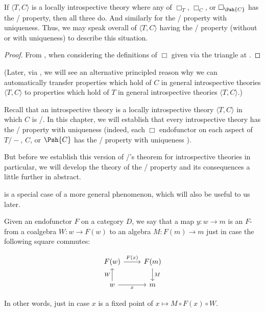 \begin{corollary}\label{LoebTransferIntrosp}
If $\langle T, C \rangle$ is a locally introspective theory where any of $\Box_T$, $\Box_C$, or $\Box_{\Psh{C}}$ has the \Loeb/ property, then all three do. And similarly for the \Loeb/ property with uniqueness. Thus, we may speak overall of $\langle T, C \rangle$ having the \Loeb/ property (without or with uniqueness) to describe this situation.
\end{corollary}
\begin{proof}
From , when considering the definitions of $\Box$ given via the triangle at .
\end{proof}

(Later, via , we will see an alternative principled reason why we can automatically transfer properties which hold of $C$ in general introspective theories $\langle T, C \rangle$ to properties which hold of $T$ in general introspective theories $\langle T, C \rangle$.)

Recall that an introspective theory is a locally introspective theory $\langle T, C \rangle$ in which $C$ is \repsmall/. In this chapter, we will establish that every introspective theory has the \Loeb/ property with uniqueness (indeed, each $\Box$ endofunctor on each aspect of $T/-$, $C$, or $\Psh{C}$ has the \Loeb/ property with uniqueness ).

But before we establish this version of \Loeb/'s theorem for introspective theories in particular, we will develop the theory of the \Loeb/ property and its consequences a little further in abstract.

 is a special case of a more general phenomenon, which will also be useful to us later. 

\begin{definition}
Given an endofunctor $F$ on a category $D$, we say that a map $y : w \to m$ is an $F$- from a coalgebra $W : w \to F(w)$ to an algebra $M : F(m) \to m$ just in case the following square commutes:

\[\begin{tikzcd}
	{F(w)} & {F(m)} \\
	w & m
	\arrow["W", from=2-1, to=1-1]
	\arrow["{F(x)}", from=1-1, to=1-2]
	\arrow["M", from=1-2, to=2-2]
	\arrow["x"', from=2-1, to=2-2]
\end{tikzcd}\]

In other words, just in case $x$ is a fixed point of $x \mapsto M \circ F(x) \circ W$.
\end{definition}

